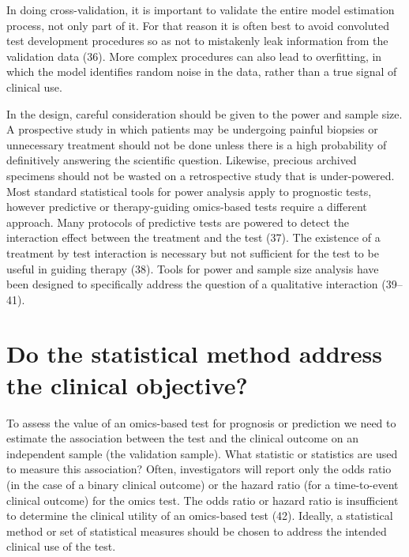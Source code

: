 \documentclass[11pt]{article}
\begin{document}
In doing cross-validation, it is important to validate the entire model
estimation process, not only part of it. For that reason it is often
best to avoid convoluted test development procedures so as not to
mistakenly leak information from the validation data (36). More complex
procedures can also lead to overfitting, in which the model identifies
random noise in the data, rather than a true signal of clinical use.

In the design, careful consideration should be given to the power and
sample size. A prospective study in which patients may be undergoing
painful biopsies or unnecessary treatment should not be done unless
there is a high probability of definitively answering the scientific
question. Likewise, precious archived specimens should not be wasted on
a retrospective study that is under-powered. Most standard statistical
tools for power analysis apply to prognostic tests, however predictive
or therapy-guiding omics-based tests require a different approach. Many
protocols of predictive tests are powered to detect the interaction
effect between the treatment and the test (37). The existence of a
treatment by test interaction is necessary but not sufficient for the
test to be useful in guiding therapy (38). Tools for power and sample
size analysis have been designed to specifically address the question of
a qualitative interaction (39--41).

\section{Do the statistical method address the clinical
objective?}\label{do-the-statistical-method-address-the-clinical-objective}

To assess the value of an omics-based test for prognosis or prediction
we need to estimate the association between the test and the clinical
outcome on an independent sample (the validation sample). What statistic
or statistics are used to measure this association? Often, investigators
will report only the odds ratio (in the case of a binary clinical
outcome) or the hazard ratio (for a time-to-event clinical outcome) for
the omics test. The odds ratio or hazard ratio is insufficient to
determine the clinical utility of an omics-based test (42). Ideally, a
statistical method or set of statistical measures should be chosen to
address the intended clinical use of the test.
\end{document}
